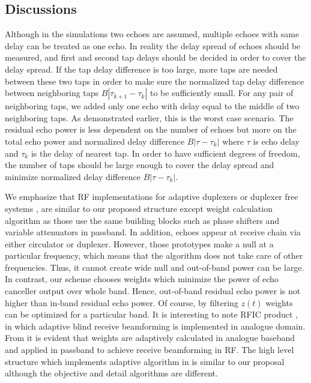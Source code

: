 \documentclass[twocolumn]{IEEEtran}
\begin{document}
\subsection{Discussions}

Although in the simulations two echoes are assumed, multiple echoes
with same delay can be treated as one echo. In reality the delay
spread of echoes should be measured, and first and second tap delays
should be decided in order to cover the delay spread. If the tap
delay difference is too large, more taps are needed between these
two taps in order to make sure the normalized tap delay difference
between neighboring taps $B|\tau_{k+1}-\tau_k|$ to be sufficiently
small. For any pair of neighboring taps, we added only one echo with
delay equal to the middle of two neighboring taps. As demonstrated
earlier, this is the worst case scenario. The residual echo power is
less dependent on the number of echoes but more on the total echo
power and normalized delay difference $B|\tau-\tau_k|$ where $\tau$
is echo delay and $\tau_k$ is the delay of nearest tap. In order to
have sufficient degrees of freedom, the number of taps should be
large enough to cover the delay spread and minimize normalized delay
difference $B|\tau-\tau_k|$.

We emphasize that RF implementations for adaptive duplexers or
duplexer free systems \cite{dfs1}, \cite{dfs2} are similar to our
proposed structure except weight calculation algorithm as those use
the same building blocks such as phase shifters and variable
attenuators in passband. In addition, echoes appear at receive chain
via either circulator or duplexer. However, those prototypes make a
null at a particular frequency, which means that the algorithm does
not take care of other frequencies. Thus, it cannot create wide null
and out-of-band power can be large. In contrast, our scheme chooses
weights which minimize the power of echo canceller output over whole
band. Hence, out-of-band residual echo power is not higher than
in-band residual echo power. Of course, by filtering $z(t)$ weights
can be optimized for a particular band. It is interesting to note
RFIC product \cite{motia}, \cite{motia2} in which adaptive blind
receive beamforming is implemented in analogue domain. From
\cite{motia2} it is evident that weights are adaptively calculated
in analogue baseband and applied in passband to achieve receive
beamforming in RF. The high level structure which implements
adaptive algorithm in \cite{motia2} is similar to our proposal
although the objective and detail algorithms are different.
\end{document}
